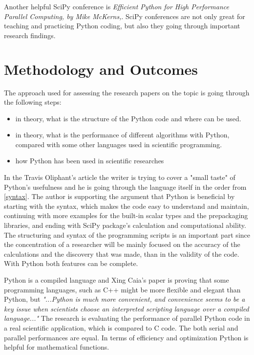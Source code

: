 Another helpful SciPy conference is \textit{Efficient Python for High Performance Parallel Computing, by Mike McKerns,}. \cite{efficientPython} SciPy conferences are not only great for teaching and practicing Python coding, but also they going through important research findings. \cite{sciPy} 

\section{Methodology and Outcomes}
The approach used for assessing the research papers on the topic is going through the following steps:
\begin{itemize}
  \item in theory, what is the structure of the Python code and where can be used. 
  \item in theory, what is the performance of different algorithms with Python, compared with some other languages used in scientific programming.
  \item how Python has been used in scientific researches 
 \end{itemize}
 
 In the Travis Oliphant's article \cite{oliphant2007python} the writer is trying to cover a "small taste" of Python’s usefulness and he is going through the language itself in the order from \ref{syntax}. The author is supporting the argument that Python is beneficial by starting with the syntax, which makes the code easy to understand and maintain, continuing with more examples for the built-in scalar types and the prepackaging libraries, and ending with SciPy package's calculation and computational ability. The structuring and syntax of the programming scripts is an important part since the concentration of a researcher will be mainly focused on the accuracy of the calculations and the discovery that was made, than in the validity of the code. With Python both features can be complete. 
 
Python is a compiled language and Xing Caia's paper \cite{cai2005performance} 
is proving that some programming languages, such as C++ might be more flexible and elegant than Python, but \textit{"...Python is much more convenient, and convenience seems to be a key issue when scientists choose an interpreted scripting language over a compiled language..."} \cite{cai2005performance} The research is evaluating the performance of parallel Python code in a real scientific application, which is compared to C code. The both serial and parallel performances are equal. In terms of efficiency and optimization Python is helpful for mathematical functions.

